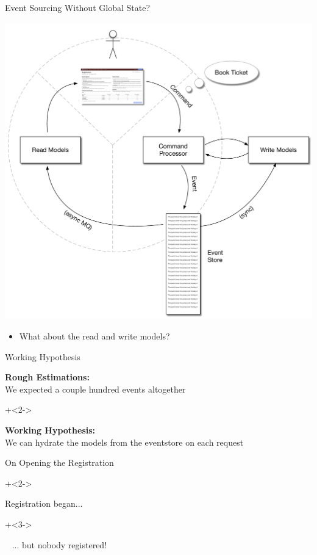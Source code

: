 \begin{frame}[fragile]{Event Sourcing Without Global State?}

\includegraphics[width=.5\textwidth]{../EventSourcing4.pdf}

\begin{itemize}
\item What about the read and write models?
\end{itemize}

\end{frame}

\begin{frame}[fragile]{Working Hypothesis}

\textbf{Rough Estimations:} \\[.7em]
We expected a couple hundred events altogether

\onslide+<2->
\vspace{5em}

\textbf{Working Hypothesis:} \\[.7em]
We can hydrate the models from the eventstore on each request

\end{frame}


\begin{frame}[fragile]{On Opening the Registration}

\onslide+<2->

Registration began...

\onslide+<3->

\vspace{3em}

~ \hspace{10em} ... but nobody registered!
 
\end{frame}

